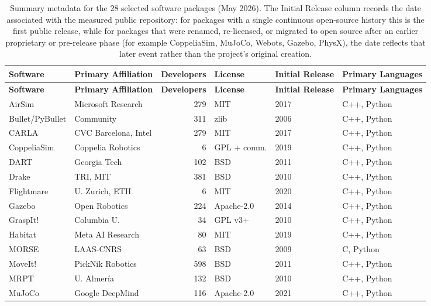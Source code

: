 \begingroup
\small
\singlespacing
\begin{longtable}{@{}P{2.2cm}P{2.7cm}rP{1.7cm}P{1.3cm}P{1.8cm}@{}}
\caption{Summary metadata for the 28 selected software packages (May 2026). The Initial Release column records the date associated with the measured public repository: for packages with a single continuous open-source history this is the first public release, while for packages that were renamed, re-licensed, or migrated to open source after an earlier proprietary or pre-release phase (for example CoppeliaSim, MuJoCo, Webots, Gazebo, PhysX), the date reflects that later event rather than the project's original creation.}
\label{tab:summary-metadata}\\
\toprule
\textbf{Software} & \textbf{Primary Affiliation} & \textbf{Developers} & \textbf{License} & \textbf{Initial Release} & \textbf{Primary Languages} \\
\midrule
\endfirsthead
\toprule
\textbf{Software} & \textbf{Primary Affiliation} & \textbf{Developers} & \textbf{License} & \textbf{Initial Release} & \textbf{Primary Languages} \\
\midrule
\endhead
\bottomrule
\endlastfoot
AirSim & Microsoft Research & 279 & MIT & 2017 & C++, Python \\
Bullet/\allowbreak{}PyBullet & Community & 311 & zlib & 2006 & C++, Python \\
CARLA & CVC Barcelona, Intel & 279 & MIT & 2017 & C++, Python \\
CoppeliaSim & Coppelia Robotics & 6 & GPL + comm. & 2019 & C++, Python \\
DART & Georgia Tech & 102 & BSD & 2011 & C++, Python \\
Drake & TRI, MIT & 381 & BSD & 2010 & C++, Python \\
Flightmare & U. Zurich, ETH & 6 & MIT & 2020 & C++, Python \\
Gazebo & Open Robotics & 224 & Apache-2.0 & 2014 & C++, Python \\
GraspIt! & Columbia U. & 34 & GPL v3+ & 2010 & C++, Python \\
Habitat & Meta AI Research & 80 & MIT & 2019 & C++, Python \\
MORSE & LAAS-CNRS & 63 & BSD & 2009 & C, Python \\
MoveIt! & PickNik Robotics & 598 & BSD & 2011 & C++, Python \\
MRPT & U. Almer\'{i}a & 132 & BSD & 2010 & C++, Python \\
MuJoCo & Google DeepMind & 116 & Apache-2.0 & 2021 & C++, Python \\

\end{longtable}
